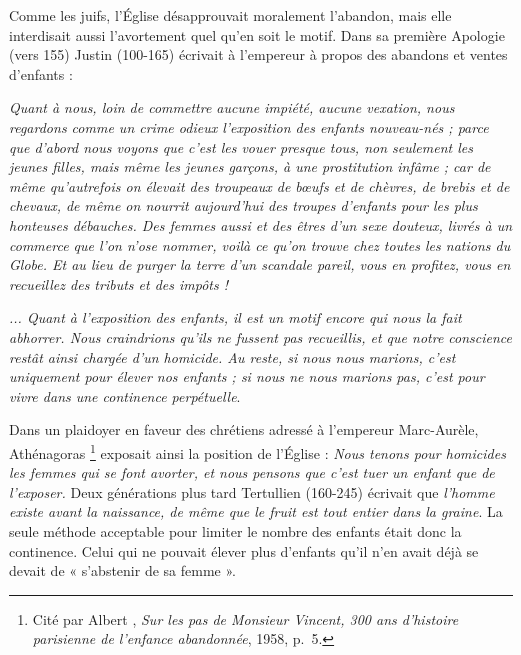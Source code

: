  Comme les juifs, l'Église désapprouvait moralement l'abandon, mais elle interdisait aussi l'avortement quel qu'en soit le motif. Dans sa première Apologie (vers 155) Justin (100-165) écrivait à l'empereur à propos des abandons et ventes d'enfants :

\begin{displayquote}
\emph{Quant à nous, loin de commettre aucune impiété, aucune vexation, nous regardons comme un crime odieux l'exposition des enfants nouveau-nés ; parce que d'abord nous voyons que c'est les vouer presque tous, non seulement les jeunes filles, mais même les jeunes garçons, à une prostitution infâme ; car de même qu'autrefois on élevait des troupeaux de bœufs et de chèvres, de brebis et de chevaux, de même on nourrit aujourd'hui des troupes d'enfants pour les plus honteuses débauches. Des femmes aussi et des êtres d'un sexe douteux, livrés à un commerce que l'on n'ose nommer, voilà ce qu'on trouve chez toutes les nations du Globe. Et au lieu de purger la terre d'un scandale pareil, vous en profitez, vous en recueillez des tributs et des impôts !}

 \emph{... Quant à l'exposition des enfants, il est un motif encore qui nous la fait abhorrer. Nous craindrions qu'ils ne fussent pas recueillis, et que notre conscience restât ainsi chargée d'un homicide. Au reste, si nous nous marions, c'est uniquement pour élever nos enfants ; si nous ne nous marions pas, c'est pour vivre dans une continence perpétuelle}.
\end{displayquote}

 Dans un plaidoyer en faveur des chrétiens adressé à l'empereur Marc-Aurèle, Athénagoras%
\footnote{Cité par Albert , \emph{Sur les pas de Monsieur Vincent, 300 ans d'histoire parisienne de l'enfance abandonnée}, 1958, p.~5.}
exposait ainsi la position de l'Église : \emph{Nous tenons pour homicides les femmes qui se font avorter, et nous pensons que c'est tuer un enfant que de l'exposer.}  Deux générations plus tard Tertullien (160-245) écrivait que \emph{l'homme existe avant la naissance, de même que le fruit est tout entier dans la graine}. La seule méthode acceptable pour limiter le nombre des enfants était donc la continence. Celui qui ne pouvait élever plus d'enfants qu'il n'en avait déjà se devait de « s'abstenir de sa femme ».
 








